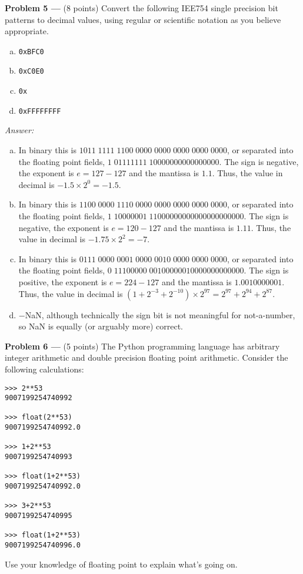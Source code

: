 \documentclass[11pt]{article}
\newcommand{\problem}[1]{\textbf{Problem #1 ---} }
\newcommand{\answer}{{\color{red}\textit{Answer: }}}
\begin{document}
\problem{5}(8 points) Convert the following IEE754 single precision bit patterns to decimal values, using regular or scientific notation as you believe appropriate.
\begin{enumerate}[(a)]
    \item \texttt{0x\;BFC0}
    \item \texttt{0x\;C0E0}
    \item \texttt{0x}
    \item \texttt{0x\;FFFF\;FFFF}
\end{enumerate}

\answer
{\color{blue}
\begin{enumerate}[(a)]
    \item In binary this is $1011\;1111\;1100\;0000\;0000\;0000\;0000\;0000$, or separated into the floating point fields, $1\;01111111\;10000000000000000$.  The sign is negative, the exponent is $e=127-127$ and the mantissa is $1.1$.  Thus, the value in decimal is $-1.5 \times 2^0 = -1.5$.
    \item In binary this is $1100\;0000\;1110\;0000\;0000\;0000\;0000\;0000$, or separated into the floating point fields, $1\;10000001\;11000000000000000000000$.  The sign is negative, the exponent is $e=120-127$ and the mantissa is $1.11$.  Thus, the value in decimal is $-1.75 \times 2^2 = -7$.
    \item In binary this is $0111\;0000\;0001\;0000\;0010\;0000\;0000\;0000$, or separated into the floating point fields, $0\;11100000\;00100000010000000000000$.  The sign is positive, the exponent is $e=224-127$ and the mantissa is $1.0010000001$.  Thus, the value in decimal is $(1+2^{-3}+2^{-10}) \times 2^{97} = 2^{97} + 2^{94} + 2^{87}$.
    \item $-$NaN, although technically the sign bit is not meaningful for not-a-number, so NaN is equally (or arguably more) correct.
\end{enumerate}
}

\problem{6}(5 points) The Python programming language has arbitrary integer arithmetic and double precision floating point arithmetic.  Consider the following calculations:
\begin{verbatim}
>>> 2**53
9007199254740992

>>> float(2**53)
9007199254740992.0

>>> 1+2**53
9007199254740993

>>> float(1+2**53)
9007199254740992.0

>>> 3+2**53
9007199254740995

>>> float(1+2**53)
9007199254740996.0
\end{verbatim}
Use your knowledge of floating point to explain what's going on.
\end{document}

